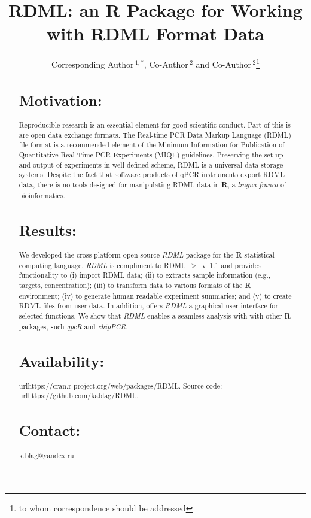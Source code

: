 \documentclass{bioinfo}
\begin{document}
	
	\title[RDML]{RDML: an \textbf{R} Package for Working with RDML Format Data}
	\author[Sample \textit{et~al}]{Corresponding Author\,$^{1,*}$, Co-Author\,$^{2}$
		and Co-Author\,$^2$\footnote{to whom correspondence should be addressed}}
	\address{$^{1}$Department of XXXXXXX, Address XXXX etc.\\ $^{2}$Department of
		XXXXXXXX, Address XXXX etc.}
	
	
	
	\maketitle
	
	\begin{abstract}
		
		\section{Motivation:} Reproducible research is an essential 
		element for good scientific conduct. Part of this is are open data exchange 
		formats. The  Real-time PCR Data Markup Language
		(RDML) file format is a recommended element of the Minimum 
		Information for Publication of Quantitative Real-Time PCR Experiments (MIQE) 
		guidelines. Preserving the set-up and output of experiments in well-defined 
		scheme, RDML is a universal data storage systems. Despite the fact 
		that software products of qPCR instruments export RDML data, 
		there is no tools designed for manipulating RDML data in \textbf{R}, a 
		\textit{lingua franca} of bioinformatics.
		
		\section{Results:} We developed the cross-platform open source 
		\textit{RDML} package for the  \textbf{R} statistical computing language. 
		\textit{RDML} is compliment to RDML~$\geq$~v~1.1 and provides functionality to 
		(i) import RDML data; (ii) to extracts sample information (e.g., targets, 
		concentration); (iii) to transform data to various formats of the \textbf{R} 
		environment; (iv) to generate human readable experiment summaries; and (v) to 
		create RDML files from user data. In addition, offers \textit{RDML} a graphical 
		user interface for selected functions. We show that \textit{RDML} enables a 
		seamless analysis with with other \textbf{R} packages, such \textit{qpcR} and 
		\textit{chipPCR}.

		\section{Availability:}
		url{https://cran.r-project.org/web/packages/RDML}. Source code:
		url{https://github.com/kablag/RDML}. \section{Contact:}
		\href{k.blag@yandex.ru}{k.blag@yandex.ru} \end{abstract}
	
\end{document}
